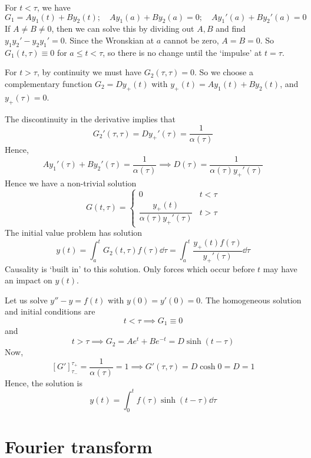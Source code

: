 \documentclass[a4paper]{article}
\begin{document}
For \( t < \tau \), we have
\[
	G_1 = A y_1(t) + B y_2(t);\quad A y_1(a) + B y_2(a) = 0;\quad A y_1'(a) + B y_2'(a) = 0
\]
If \( A \neq B \neq 0 \), then we can solve this by dividing out \( A, B \) and find \( y_1 y_2' - y_2 y_1' = 0 \).
Since the Wronskian at \( a \) cannot be zero, \( A = B = 0 \).
So \( G_1(t,\tau) \equiv 0 \) for \( a \leq t < \tau \), so there is no change until the `impulse' at \( t = \tau \).

For \( t > \tau \), by continuity we must have \( G_2(\tau, \tau) = 0 \).
So we choose a complementary function \( G_2 = D y_+(t) \) with \( y_+(t) = A y_1(t) + B y_2(t) \), and \( y_+(\tau) = 0 \).

The discontinuity in the derivative implies that
\[
	G_2'(\tau, \tau) = Dy_+'(\tau) = \frac{1}{\alpha(\tau)}
\]
Hence,
\[
	A y_1'(\tau) + B y_2'(\tau) = \frac{1}{\alpha(\tau)} \implies D(\tau) = \frac{1}{\alpha(\tau) y_+'(\tau)}
\]
Hence we have a non-trivial solution
\[
	G(t, \tau) = \begin{cases}
		0                                      & t < \tau \\
		\dfrac{y_+(t)}{\alpha(\tau) y_+'(\tau)} & t > \tau
	\end{cases}
\]
The initial value problem has solution
\[
	y(t) = \int_a^t G_2(t, \tau) f(\tau) \dd{\tau} = \int_a^t \frac{y_+(t) f(\tau)}{y_+'(\tau)} \dd{\tau}
\]
Causality is `built in' to this solution.
Only forces which occur before \( t \) may have an impact on \( y(t) \).
\begin{example}
	Let us solve \( y''-y = f(t) \) with \( y(0) = y'(0) = 0 \).
	The homogeneous solution and initial conditions are
	\[
		t < \tau \implies G_1 \equiv 0
	\]
	and
	\[
		t > \tau \implies G_2 = A e^t + Be^{-t} = D \sinh (t - \tau)
	\]
	Now,
	\[
		[G']_{\tau_-}^{\tau_+} = \frac{1}{\alpha(\tau)} = 1 \implies G'(\tau, \tau) = D \cosh 0 = D = 1
	\]
	Hence, the solution is
	\[
		y(t) = \int_0^t f(\tau) \sinh (t - \tau) \dd{\tau}
	\]
\end{example}

\section{Fourier transform}
\end{document}
